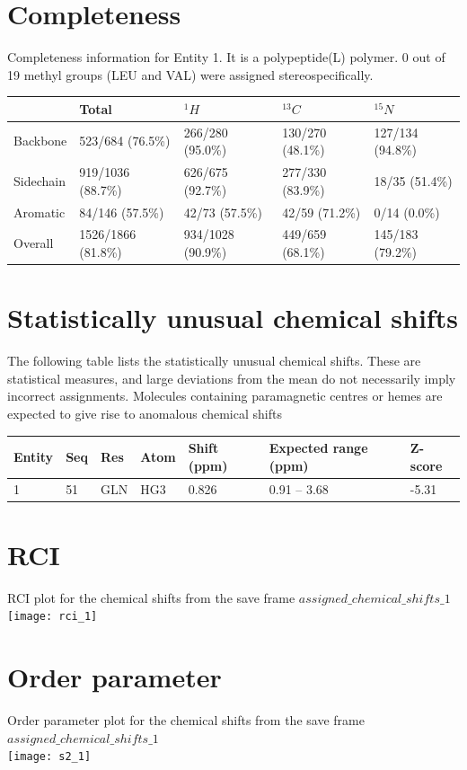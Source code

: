 \section{Completeness}
Completeness information for Entity 1. It is a polypeptide(L) polymer. 0 out of 19 methyl groups (LEU and VAL) were assigned stereospecifically.\begin{longtable}{|l|l|l|l|l|}
\hline
  & Total & $^{1}H$ & $^{13}C$ & $^{15}N$\\\hline
Backbone & 523/684 (76.5\%)& 266/280 (95.0\%)& 130/270 (48.1\%)& 127/134 (94.8\%) \\
\hline
Sidechain & 919/1036 (88.7\%)& 626/675 (92.7\%)& 277/330 (83.9\%)& 18/35 (51.4\%) \\
\hline
Aromatic & 84/146 (57.5\%)& 42/73 (57.5\%)& 42/59 (71.2\%)& 0/14 (0.0\%) \\
\hline
Overall & 1526/1866 (81.8\%)& 934/1028 (90.9\%)& 449/659 (68.1\%)& 145/183 (79.2\%) \\
\hline
\end{longtable}

\section{Statistically unusual chemical shifts}
The following table lists the statistically unusual chemical shifts. These are statistical measures, and large deviations from the mean do not necessarily imply incorrect assignments. Molecules containing paramagnetic centres or hemes are expected to give rise to anomalous chemical shifts\\\begin{longtable}{|l|l|l|l|l|l|l|}
\hline
Entity & Seq & Res & Atom & Shift (ppm) & Expected range (ppm) & Z-score\\\hline
1 & 51 & GLN & HG3 & 0.826 & 0.91 -- 3.68 & -5.31\\
\hline
\end{longtable}

\section{RCI}
RCI plot for the chemical shifts from the  save frame $assigned\_chemical\_shifts\_1$\\ \texttt{[image: rci\_1]}\\

\section{Order parameter}
Order parameter plot for the chemical shifts from the  save frame $assigned\_chemical\_shifts\_1$\\ \texttt{[image: s2\_1]}\\

